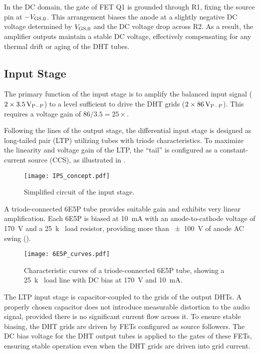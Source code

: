 In the DC domain, the gate of FET Q1 is grounded through R1, fixing the source pin at $-V_{\rm GS,0}$. This arrangement biases the anode at a slightly negative DC voltage determined by $V_{\rm GS,0}$ and the DC voltage drop across R2. As a result, the amplifier outputs maintain a stable DC voltage, effectively compensating for any thermal drift or aging of the DHT tubes.


\subsection{Input Stage}

The primary function of the input stage is to amplify the balanced input signal ($2 \times \SI{3.5}{V_{P-P}}$) to a level sufficient to drive the DHT grids ($2 \times \SI{86}{V_{P-P}}$). This requires a voltage gain of $86 / 3.5 = 25\times$.

Following the lines of the output stage, the differential input stage is designed as long-tailed pair (LTP)\cite{valvewizard_LTP} utilizing tubes with triode characteristics. To maximize the linearity and voltage gain of the LTP, the ``tail'' is configured as a constant-current source (CCS), as illustrated in .

\begin{figure}
\begin{center}
\texttt{[image: IPS\_concept.pdf]}
\caption{Simplified circuit of the input stage.}
\end{center}
\end{figure}

A triode-connected 6E5P tube provides suitable gain and exhibits very linear amplification\cite{bartola_thdbenchmark,osdeha_p33}. Each 6E5P is biased at \SI{10}{mA} with an anode-to-cathode voltage of \SI{170}{V} and a \SI{25}{k\Ohm} load resistor, providing more than \SI{\pm100}{V} of anode AC swing ().

\begin{figure}
\begin{center}
\texttt{[image: 6E5P\_curves.pdf]}
\caption{Characteristic curves of a triode-connected 6E5P tube, showing a \SI{25}{k\Ohm} load line with DC bias at \SI{170}{V} and \SI{10}{mA}.}
\end{center}
\end{figure}

The LTP input stage is capacitor-coupled to the grids of the output DHTs. A properly chosen capacitor does not introduce measurable distortion to the audio signal\cite{bateman_caps_distortion}, provided there is no significant current flow across it\cite{aiken_farting_out}. To ensure stable biasing, the DHT grids are driven by FETs configured as source followers. The DC bias voltage for the DHT output tubes is applied to the gates of these FETs, ensuring stable operation even when the DHT grids are driven into grid current.


